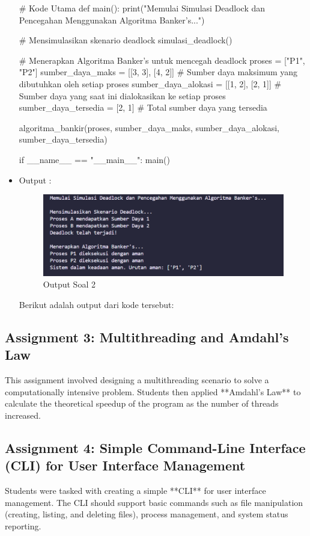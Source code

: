 \documentclass[12pt]{article}
\begin{document}
\begin{itemize}
\begin{python}
# Kode Utama
def main():
    print("Memulai Simulasi Deadlock dan Pencegahan Menggunakan Algoritma Banker's...\n")
    
    # Mensimulasikan skenario deadlock
    simulasi_deadlock()
    
    # Menerapkan Algoritma Banker's untuk mencegah deadlock
    proses = ["P1", "P2"]
    sumber_daya_maks = [[3, 3], [4, 2]]  # Sumber daya maksimum yang dibutuhkan oleh setiap proses
    sumber_daya_alokasi = [[1, 2], [2, 1]]  # Sumber daya yang saat ini dialokasikan ke setiap proses
    sumber_daya_tersedia = [2, 1]  # Total sumber daya yang tersedia

    algoritma_bankir(proses, sumber_daya_maks, sumber_daya_alokasi, sumber_daya_tersedia)

if __name__ == "__main__":
    main()
    \end{python}
    
    \item Output : 
    \begin{figure}[h]
        \centering
        \includegraphics[width=0.70\linewidth]{b_class/asset/output2.png}
        \caption{Output Soal 2}
        \label{fig:enter-label}
    \end{figure}

\newline Berikut adalah output dari kode tersebut:
\end{itemize}
\subsection{Assignment 3: Multithreading and Amdahl's Law}
This assignment involved designing a multithreading scenario to solve a computationally intensive problem. Students then applied **Amdahl's Law** to calculate the theoretical speedup of the program as the number of threads increased.

\subsection{Assignment 4: Simple Command-Line Interface (CLI) for User Interface Management}
Students were tasked with creating a simple **CLI** for user interface management. The CLI should support basic commands such as file manipulation (creating, listing, and deleting files), process management, and system status reporting.
\end{document}
